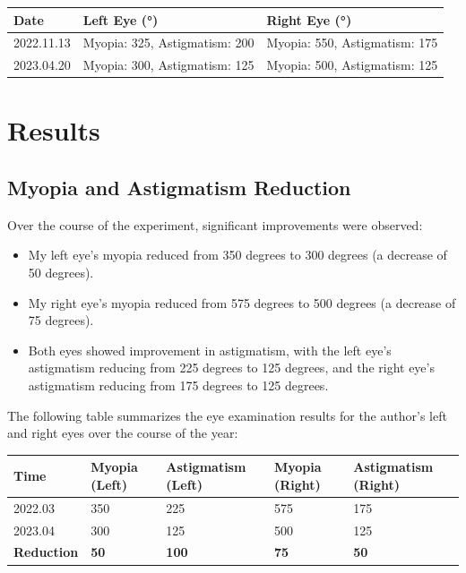 \documentclass[12pt]{article}
\begin{document}
\begin{table}[h!]
\centering
\begin{tabularx}{\textwidth}{|X|X|X|}
\hline
\textbf{Date} & \textbf{Left Eye (°)} & \textbf{Right Eye (°)} \\
\hline
2022.11.13 & Myopia: 325, Astigmatism: 200 & Myopia: 550, Astigmatism: 175 \\
\hline
2023.04.20 & Myopia: 300, Astigmatism: 125 & Myopia: 500, Astigmatism: 125 \\
\hline
\end{tabularx}
\end{table}

\section{Results}

\subsection{Myopia and Astigmatism Reduction}
Over the course of the experiment, significant improvements were observed:
\begin{itemize}
    \item My left eye's myopia reduced from 350 degrees to 300 degrees (a decrease of 50 degrees).
    \item My right eye's myopia reduced from 575 degrees to 500 degrees (a decrease of 75 degrees).
    \item Both eyes showed improvement in astigmatism, with the left eye's astigmatism reducing from 225 degrees to 125 degrees, and the right eye's astigmatism reducing from 175 degrees to 125 degrees.
\end{itemize}

The following table summarizes the eye examination results for the author's left and right eyes over the course of the year:

\begin{table}[h!]
\centering
\begin{tabularx}{\textwidth}{|X|X|X|X|X|}
\hline
\textbf{Time} & \textbf{Myopia (Left)} & \textbf{Astigmatism (Left)} & \textbf{Myopia (Right)} & \textbf{Astigmatism (Right)} \\
\hline
2022.03 & 350 & 225 & 575 & 175 \\
2023.04 & 300 & 125 & 500 & 125 \\
\hline
\textbf{Reduction} & \textbf{50} & \textbf{100} & \textbf{75} & \textbf{50} \\
\hline
\end{tabularx}
\end{table}
\end{document}
